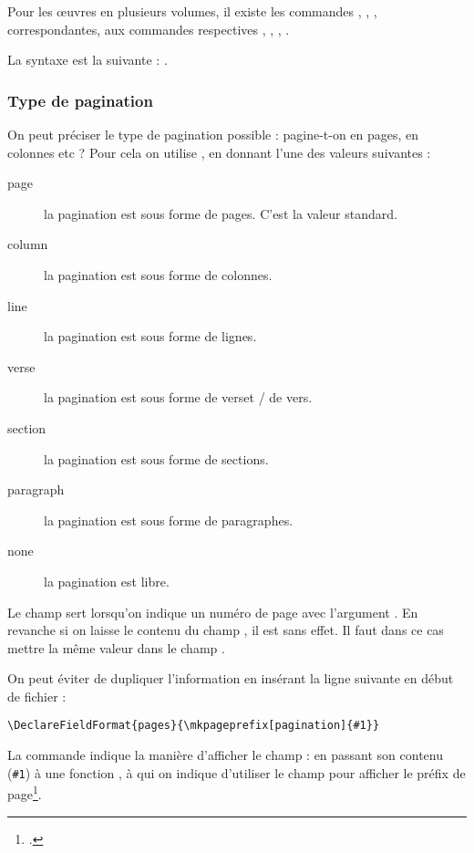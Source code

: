 \begin{plusloins}
Pour les œuvres en plusieurs volumes, il existe les commandes , , ,  correspondantes, aux commandes respectives , , , .

La syntaxe est la suivante : .
\end{plusloins}

\subsubsection{Type de pagination}

On peut préciser le type de pagination possible : pagine-t-on en pages, en colonnes etc ? Pour cela on utilise  , en donnant l'une des valeurs suivantes : 

\begin{description}
\item[page] la pagination est sous forme de pages. C'est la valeur standard.
\item[column] la pagination est sous forme de colonnes.
\item[line] la pagination est sous forme de lignes.
\item[verse] la pagination est sous forme de verset / de vers. 
\item[section] la pagination est sous forme de sections.
\item[paragraph] la pagination est sous forme de paragraphes.
\item[none] la pagination est libre.
\end{description}

Le champ   sert lorsqu'on indique un numéro de page avec l'argument . En revanche si on laisse le contenu du champ , il est sans effet. Il faut dans ce cas mettre la même valeur dans le champ .

\begin{plusloins}
On peut éviter de dupliquer l'information en insérant la ligne suivante en début de fichier  :

\begin{verbatim}
\DeclareFieldFormat{pages}{\mkpageprefix[pagination]{#1}}
\end{verbatim}

La commande  indique la manière d'afficher le champ  : en passant son contenu (\verb|#1|) à une fonction , à qui on indique d'utiliser le champ  pour afficher le préfix de page\footcite[Voir][]{biblatex_formating}.

\end{plusloins}

